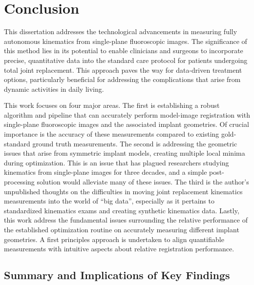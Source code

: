 \chapter{Conclusion}

This dissertation addresses the technological advancements in measuring fully autonomous kinematics from single-plane fluoroscopic images.
The significance of this method lies in its potential to enable clinicians and surgeons to incorporate precise, quantitative data into the standard care protocol for patients undergoing total joint replacement.
This approach paves the way for data-driven treatment options, particularly beneficial for addressing the complications that arise from dynamic activities in daily living.

This work focuses on four major areas.
The first is establishing a robust algorithm and pipeline that can accurately perform model-image registration with single-plane fluoroscopic images and the associated implant geometries.
Of crucial importance is the accuracy of these measurements compared to existing gold-standard ground truth measurements.
The second is addressing the geometric issues that arise from symmetric implant models, creating multiple local minima during optimization.
This is an issue that has plagued researchers studying kinematics from single-plane images for three decades, and a simple post-processing solution would alleviate many of these issues.
The third is the author's unpublished thoughts on the difficulties in moving joint replacement kinematics measurements into the world of ``big data'', especially as it pertains to standardized kinematics exams and creating synthetic kinematics data.
Lastly, this work address the fundamental issues surrounding the relative performance of the established optimization routine on accurately measuring different implant geometries.
A first principles approach is undertaken to align quantifiable measurements with intuitive aspects about relative registration performance.

\section{Summary and Implications of Key Findings}
